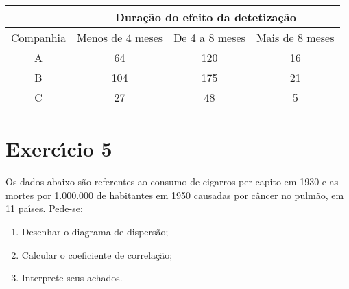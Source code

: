 \documentclass[a4paper,11pt,twoside,openright]{report}
\begin{document}
\begin{center}
\begin{tabular}{l|l|l|l}
\hline
 & \multicolumn{3}{c}{Dura\c{c}\~{a}o do efeito da detetiza\c{c}\~{a}o} \\ 
\hline
\multicolumn{1}{c|}{Companhia} & \multicolumn{1}{c|}{Menos de 4 meses} & \multicolumn{1}{c|}{De 4 a 8 meses} & \multicolumn{1}{c}{Mais de 8 meses} \\ 
\hline
\multicolumn{1}{c|}{A} & \multicolumn{1}{c|}{64} & \multicolumn{1}{c|}{120} & \multicolumn{1}{c}{16} \\ 
\multicolumn{1}{c|}{B} & \multicolumn{1}{c|}{104} & \multicolumn{1}{c|}{175} & \multicolumn{1}{c}{21} \\ 
\multicolumn{1}{c|}{C} & \multicolumn{1}{c|}{27} & \multicolumn{1}{c|}{48} & \multicolumn{1}{c}{5} \\ 
\hline
\end{tabular}
\end{center}

\section*{Exerc\'{\i}cio 5}
\hspace{0.5cm}Os dados abaixo s\~{a}o referentes ao consumo de cigarros per capito em 1930 e as mortes por 1.000.000 de habitantes em 1950 causadas por c\^{a}ncer no pulm\~{a}o, 
em 11 pa\'{\i}ses. Pede-se:

\begin{enumerate}
	\item Desenhar o diagrama de dispers\~{a}o;
	\item Calcular o coeficiente de correla\c{c}\~{a}o;
	\item Interprete seus achados.
\end{enumerate}
\end{document}

